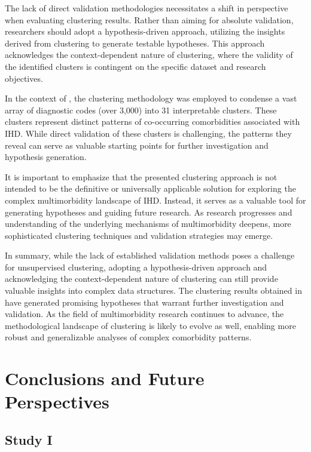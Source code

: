 The lack of direct validation methodologies necessitates a shift in perspective
when evaluating clustering results. Rather than aiming for absolute validation,
researchers should adopt a hypothesis-driven approach, utilizing the insights
derived from clustering to generate testable hypotheses. This approach
acknowledges the context-dependent nature of clustering, where the validity of
the identified clusters is contingent on the specific dataset and research
objectives.

In the context of \studyi{}, the clustering methodology was employed to
condense a vast array of diagnostic codes (over 3,000) into 31 interpretable
clusters. These clusters represent distinct patterns of co-occurring
comorbidities associated with \ac{IHD}. While direct validation of these
clusters is challenging, the patterns they reveal can serve as valuable
starting points for further investigation and hypothesis generation.

It is important to emphasize that the presented clustering approach is not
intended to be the definitive or universally applicable solution for exploring
the complex multimorbidity landscape of \ac{IHD}. Instead, it serves as a
valuable tool for generating hypotheses and guiding future research. As
research progresses and understanding of the underlying mechanisms of
multimorbidity deepens, more sophisticated clustering techniques and validation
strategies may emerge.

In summary, while the lack of established validation methods poses a challenge
for unsupervised clustering, adopting a hypothesis-driven approach and
acknowledging the context-dependent nature of clustering can still provide
valuable insights into complex data structures. The clustering results obtained
in \studyi{} have generated promising hypotheses that warrant further
investigation and validation. As the field of multimorbidity research continues
to advance, the methodological landscape of clustering is likely to evolve as
well, enabling more robust and generalizable analyses of complex comorbidity
patterns.


\chapter{Conclusions and Future Perspectives}
\label{chap:conclusions}

\section{Study I}

